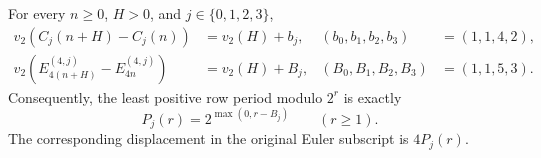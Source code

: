 \begin{theorem}
\label{thm:rank-four-exact-periods}
For every $n\geq0$, $H>0$, and $j\in\{0,1,2,3\}$,
\begin{align}
 v_2(C_j(n+H)-C_j(n))&=v_2(H)+b_j,
      &(b_0,b_1,b_2,b_3)&=(1,1,4,2),\label{eq:rank-four-normalized-isometry}\\
 v_2(E_{4(n+H)}^{(4,j)}-E_{4n}^{(4,j)})&=v_2(H)+B_j,
      &(B_0,B_1,B_2,B_3)&=(1,1,5,3).
 \label{eq:rank-four-original-isometry}
\end{align}
Consequently, the least positive row period modulo $2^r$ is exactly
\begin{equation}
 P_j(r)=2^{\max(0,r-B_j)}\qquad(r\geq1).
 \label{eq:rank-four-least-period-final}
\end{equation}
The corresponding displacement in the original Euler subscript is
$4P_j(r)$.
\end{theorem}

